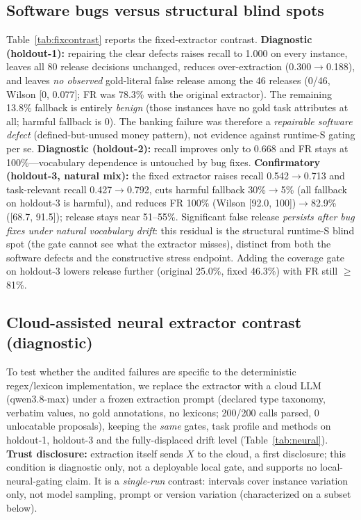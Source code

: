 \documentclass[11pt,a4paper]{article}
\begin{document}
\subsection{Software bugs versus structural blind spots}\label{sec:res-fix}
Table~\ref{tab:fixcontrast} reports the fixed-extractor contrast. \textbf{Diagnostic (holdout-1):} repairing the clear defects raises recall to 1.000 on every instance, leaves all 80 release decisions unchanged, reduces over-extraction (0.300$\to$0.188), and leaves \emph{no observed} gold-literal false release among the 46 releases (0/46, Wilson [0, 0.077]; FR was 78.3\% with the original extractor). The remaining 13.8\% fallback is entirely \emph{benign} (those instances have no gold task attributes at all; harmful fallback is 0). The banking failure was therefore a \emph{repairable software defect} (defined-but-unused money pattern), not evidence against runtime-S gating per se. \textbf{Diagnostic (holdout-2):} recall improves only to 0.668 and FR stays at 100\%---vocabulary dependence is untouched by bug fixes. \textbf{Confirmatory (holdout-3, natural mix):} the fixed extractor raises recall 0.542$\to$0.713 and task-relevant recall 0.427$\to$0.792, cuts harmful fallback 30\%$\to$5\% (all fallback on holdout-3 is harmful), and reduces FR 100\% (Wilson [92.0, 100])$\to$82.9\% ([68.7, 91.5]); release stays near 51--55\%. Significant false release \emph{persists after bug fixes under natural vocabulary drift}: this residual is the structural runtime-S blind spot (the gate cannot see what the extractor misses), distinct from both the software defects and the constructive stress endpoint. Adding the coverage gate on holdout-3 lowers release further (original 25.0\%, fixed 46.3\%) with FR still $\ge$81\%.

\subsection{Cloud-assisted neural extractor contrast (diagnostic)}\label{sec:res-neural}
To test whether the audited failures are specific to the deterministic regex/lexicon implementation, we replace the extractor with a cloud LLM (qwen3.8-max) under a frozen extraction prompt (declared type taxonomy, verbatim values, no gold annotations, no lexicons; 200/200 calls parsed, 0 unlocatable proposals), keeping the \emph{same} gates, task profile and methods on holdout-1, holdout-3 and the fully-displaced drift level (Table~\ref{tab:neural}). \textbf{Trust disclosure:} extraction itself sends $X$ to the cloud, a first disclosure; this condition is diagnostic only, not a deployable local gate, and supports no local-neural-gating claim. It is a \emph{single-run} contrast: intervals cover instance variation only, not model sampling, prompt or version variation (characterized on a subset below).
\end{document}
